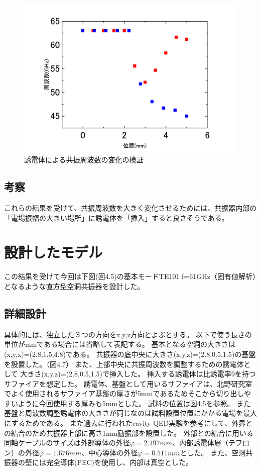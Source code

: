 \begin{figure}[h]
  \begin{center}
    \includegraphics[width=12cm]{./image/plot1.jpg}
    \caption{誘電体による共振周波数の変化の検証}
    \label{fig:Cavity}
  \end{center}
\end{figure}


\subsection{考察}
これらの結果を受けて、共振周波数を大きく変化させるためには、共振器内部の「電場振幅の大きい場所」に誘電体を「挿入」すると良さそうである。

\section{設計したモデル}
この結果を受けて今回は下図(図4.5)の基本モードTE101 f=61GHz（固有値解析）となるような直方型空洞共振器を設計した。

\subsection{詳細設計}
具体的には、独立した３つの方向をx,y,z方向とよぶとする。
以下で使う長さの単位がmmである場合には省略して表記する。
基本となる空洞の大きさは(x,y,x)=(2.8,1.5,4.8)である。
共振器の底中央に大きさ(x,y,z)=(2.8,0.5,1.5)の基盤を設置した。（図4.7）
また、上部中央に共振周波数を調整するための誘電体として
大きさ(x,y,z)=(2.8,0.5,1.5)で挿入した。
挿入する誘電体は比誘電率9を持つサファイアを想定した。
誘電体、基盤として用いるサファイアは、北野研究室でよく使用されるサファイア基盤の厚さが5mmであるためそこから切り出しやすいように今回使用する厚みも5mmとした。
試料の位置は図4.5を参照。
また基盤と周波数調整誘電体の大きさが同じなのは試料設置位置にかかる電場を最大にするためである。
また過去に行われたcavity-QED実験\cite{cQED}を参考にして、外界との結合のため共振器上部に高さ1mm励振部を設置した。
外部との結合に用いる同軸ケーブルのサイズは外部導体の外径$φ=2.197mm$、内部誘電体層（テフロン）の外径$φ=1.676mm$、中心導体の外径$φ=0.511mm$とした。
また、空洞共振器の壁には完全導体(PEC)を使用し、内部は真空とした。

